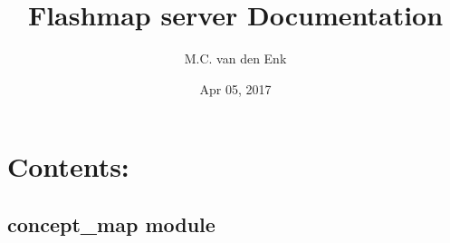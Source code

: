\documentclass[letterpaper,10pt,english]{sphinxmanual}
\title{Flashmap server Documentation}
\date{Apr 05, 2017}
\author{M.C. van den Enk}
\begin{document}
\maketitle
\sphinxtableofcontents
{}\label{\detokenize{index::doc}}


\noindent{}


\chapter{Contents:}
\label{\detokenize{index:class-diagram}}\label{\detokenize{index:contents}}

\section{concept\_map module}
\label{\detokenize{concept_map:module-concept_map}}\label{\detokenize{concept_map:concept-map-module}}\label{\detokenize{concept_map::doc}}
\end{document}
